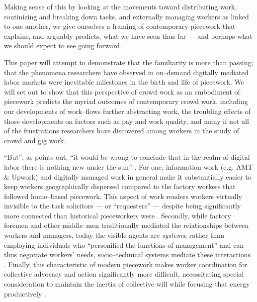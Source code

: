 \documentclass{sigchi}
\newcommand{\ali}[1]{{\color{BrickRed}[\itshape al2: #1\upshape]}}
\begin{document}
Making sense of this 
by looking at the movements toward
distributing work,
routinizing and breaking down tasks,
and externally managing workers
as linked to one another, 
we give ourselves a framing of contemporary piecework that explains,
and arguably predicts,
what we have seen thus far
--- and perhaps what we should expect to see going forward.

This paper will attempt to demonstrate that the familiarity is more than passing;
that the phenomena researchers have observed in on--demand digitally mediated labor markets
were inevitable milestones in the birth and life of piecework.
We will set out to show that this perspective of crowd work as an embodiment of piecework
predicts the myriad outcomes of contemporary crowd work, including
our developments of work--flows further abstracting work,
the troubling effects of those developments on factors such as pay and work quality, and
many if not all of the frustrations researchers have discovered among workers
in the study of crowd and gig work.

``But'',
as \citeauthor{scholz2012digital} points out,
``it would be wrong to conclude that
in the realm of digital labor there is nothing new under the sun''
\cite{scholz2012digital}.
For one, information work
(e.g. AMT \& Upwork)
and digitally managed work in general make it substantially easier
to keep workers geographically dispersed
compared to the factory workers that followed home--based piecework.
This aspect of work renders workers virtually invisible to the task solicitors
--- or ``requesters'' ---
despite being significantly more connected than historical pieceworkers were %
\cite{turkopticon}.
Secondly, while
factory foremen and other middle--men
traditionally mediated the relationships between workers and managers,
today the visible agents are \textit{systems};
rather than employing individuals who ``personified the functions of management''
and can thus negotiate workers' needs,
socio--technical systems mediate these interactions %
\cite{wray1949marginal}.
Finally, this characteristic of modern piecework makes
worker coordination for collective advocacy and action significantly more difficult,
necessitating special consideration to maintain the inertia of collective will
while focusing that energy productively
\cite{dynamo}.
\end{document}
